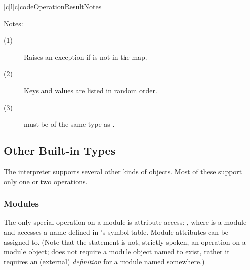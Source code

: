 \begin{tableiii}{|c|l|c|}{code}{Operation}{Result}{Notes}
\end{tableiii}
\renewcommand{\indexsubitem}{(dictionary method)}

\noindent
Notes:
\begin{description}
\item[(1)] Raises an exception if  is not in the map.

\item[(2)] Keys and values are listed in random order.

\item[(3)]  must be of the same type as .
\end{description}

\subsection{Other Built-in Types}

The interpreter supports several other kinds of objects.
Most of these support only one or two operations.

\subsubsection{Modules}

The only special operation on a module is attribute access:
, where  is a module and  accesses
a name defined in 's symbol table.  Module attributes can be
assigned to.  (Note that the  statement is not, strictly
spoken, an operation on a module object;  does not
require a module object named  to exist, rather it requires
an (external) \emph{definition} for a module named 
somewhere.)


